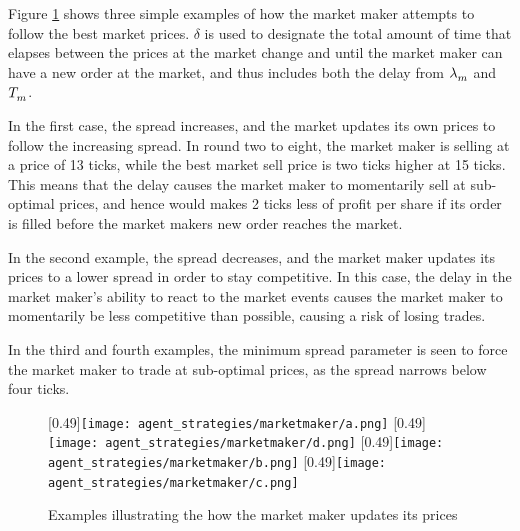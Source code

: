 Figure \ref{figure:marketmaker_strategy} shows three simple examples of how the market maker attempts to follow the best market prices. $\delta$ is used to designate the total amount of time that elapses between the prices at the market change and until the market maker can have a new order at the market, and thus includes both the delay from $\lambda_m^{}$ and $T_m^{}$. 

In the first case, the spread increases, and the market updates its own prices to follow the increasing spread. In round two to eight, the market maker is selling at a price of 13 ticks, while the best market sell price is two ticks higher at 15 ticks. This means that the delay causes the market maker to momentarily sell at sub-optimal prices, and hence would makes 2 ticks less of profit per share if its order is filled before the market makers new order reaches the market. 

In the second example, the spread decreases, and the market maker updates its prices to a lower spread in order to stay competitive. In this case, the delay in the market maker's ability to react to the market events causes the market maker to momentarily be less competitive than possible, causing a risk of losing trades. 
 
In the third and fourth examples, the minimum spread parameter \ssmmminspreadagent{} is seen to force the market maker to trade at sub-optimal prices, as the spread narrows below four ticks.

\begin{figure}
\centering
\subcaptionbox{}
[0.49\linewidth]{\texttt{[image: agent\_strategies/marketmaker/a.png]}}
\subcaptionbox{}
[0.49\linewidth]{\texttt{[image: agent\_strategies/marketmaker/d.png]}}
\subcaptionbox{}
[0.49\linewidth]{\texttt{[image: agent\_strategies/marketmaker/b.png]}}
\subcaptionbox{}
[0.49\linewidth]{\texttt{[image: agent\_strategies/marketmaker/c.png]}}
\caption{Examples illustrating the how the market maker updates its prices}
\label{figure:marketmaker_strategy}
\end{figure}


